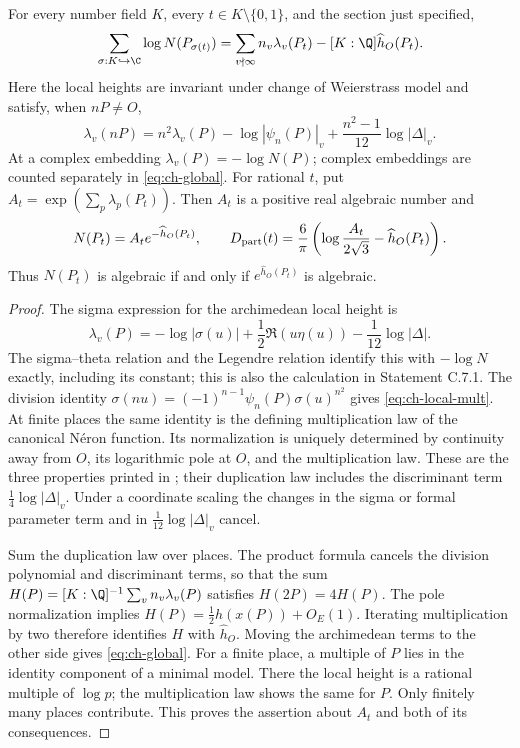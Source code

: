 \begin{statement}
For every number field $K$, every $t\in K\setminus\{0,1\}$,
and the section just specified,
\begin{equation}\label{eq:ch-global}
 \sum_{\sigma:K\hookrightarrow\C}\log N(P_{\sigma(t)})
 =\sum_{v\nmid\infty}n_v\lambda_v(P_t)
          -[K:\Q]\widehat h_O(P_t).
\end{equation}
Here the local heights are invariant under change of Weierstrass
model and satisfy, when $nP\ne O$,
\begin{equation}\label{eq:ch-local-mult}
 \lambda_v(nP)=n^2\lambda_v(P)-\log|\psi_n(P)|_v
                   +\frac{n^2-1}{12}\log|\Delta|_v.
\end{equation}
At a complex embedding $\lambda_v(P)=-\log N(P)$; complex
embeddings are counted separately in \eqref{eq:ch-global}.
For rational $t$, put $A_t=\exp(\sum_p\lambda_p(P_t))$.
Then $A_t$ is a positive real algebraic number and
\[
 N(P_t)=A_t e^{-\widehat h_O(P_t)},\qquad
 D_{\rm part}(t)=\frac6\pi
       \left(\log\frac{A_t}{2\sqrt3}-\widehat h_O(P_t)\right).
\]
Thus $N(P_t)$ is algebraic if and only if
$e^{\widehat h_O(P_t)}$ is algebraic.
\end{statement}
\begin{proof}
The sigma expression for the archimedean local height is
\[
 \lambda_v(P)=-\log|\sigma(u)|
       +\frac12\Re(u\eta(u))-\frac1{12}\log|\Delta|.
\]
The sigma--theta relation and the Legendre relation identify this
with $-\log N$ exactly, including its constant; this is also the
calculation in Statement C.7.1. The division identity
$\sigma(nu)=(-1)^{n-1}\psi_n(P)\sigma(u)^{n^2}$ gives
\eqref{eq:ch-local-mult}. At finite places the same identity is
the defining multiplication law of the canonical N\'eron function.
Its normalization is uniquely determined by continuity away from
$O$, its logarithmic pole at $O$, and the multiplication law.
These are the three properties printed in
\citet[Section 2.1]{demarco2017}; their duplication law includes
the discriminant term $\frac14\log|\Delta|_v$.
Under a coordinate scaling the changes in the sigma or formal
parameter term and in $\frac1{12}\log|\Delta|_v$ cancel.

Sum the duplication law over places. The product formula cancels
the division polynomial and discriminant terms, so that the sum
$H(P)=[K:\Q]^{-1}\sum_vn_v\lambda_v(P)$ satisfies
$H(2P)=4H(P)$. The pole normalization implies
$H(P)=\frac12h(x(P))+O_E(1)$. Iterating multiplication by two
therefore identifies $H$ with $\widehat h_O$. Moving the
archimedean terms to the other side gives \eqref{eq:ch-global}.
For a finite place, a multiple of $P$ lies in the identity component
of a minimal model. There the local height is a rational multiple
of $\log p$; the multiplication law shows the same for $P$.
Only finitely many places contribute. This proves the assertion
about $A_t$ and both of its consequences.
\end{proof}
